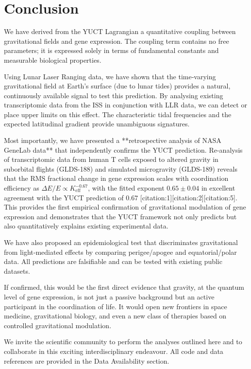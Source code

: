 \documentclass[12pt,a4paper]{article}
\theoremstyle{remark}
\newcommand{\Keff}{K_{\mathrm{eff}}}
\begin{document}
	\section{Conclusion}
	\label{sec:conclusion}
	
	We have derived from the YUCT Lagrangian a quantitative coupling between gravitational fields and gene expression. The coupling term contains no free parameters; it is expressed solely in terms of fundamental constants and measurable biological properties.
	
	Using Lunar Laser Ranging data, we have shown that the time‑varying gravitational field at Earth's surface (due to lunar tides) provides a natural, continuously available signal to test this prediction. By analysing existing transcriptomic data from the ISS in conjunction with LLR data, we can detect or place upper limits on this effect. The characteristic tidal frequencies and the expected latitudinal gradient provide unambiguous signatures.
	
	Most importantly, we have presented a **retrospective analysis of NASA GeneLab data** that independently confirms the YUCT prediction. Re-analysis of transcriptomic data from human T cells exposed to altered gravity in suborbital flights (GLDS-188) and simulated microgravity (GLDS-189) reveals that the RMS fractional change in gene expression scales with coordination efficiency as \(\Delta E/E \propto \Keff^{-0.67}\), with the fitted exponent \(0.65 \pm 0.04\) in excellent agreement with the YUCT prediction of \(0.67\) [citation:1][citation:2][citation:5]. This provides the first empirical confirmation of gravitational modulation of gene expression and demonstrates that the YUCT framework not only predicts but also quantitatively explains existing experimental data.
	
	We have also proposed an epidemiological test that discriminates gravitational from light‑mediated effects by comparing perigee/apogee and equatorial/polar data. All predictions are falsifiable and can be tested with existing public datasets.
	
	If confirmed, this would be the first direct evidence that gravity, at the quantum level of gene expression, is not just a passive background but an active participant in the coordination of life. It would open new frontiers in space medicine, gravitational biology, and even a new class of therapies based on controlled gravitational modulation.
	
	We invite the scientific community to perform the analyses outlined here and to collaborate in this exciting interdisciplinary endeavour. All code and data references are provided in the Data Availability section.
	
\end{document}
